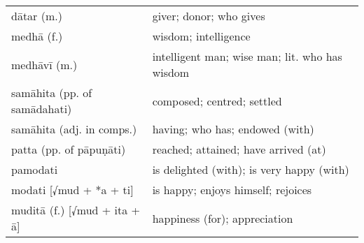 \documentclass[11pt,oneside]{memoir}
\begin{document}
\begin{longtable}{L{\colOne} L{\colTwo}}
dātar (m.) & giver; donor; who gives\\[0pt]
medhā (f.) & wisdom; intelligence\\[0pt]
medhāvī (m.) & intelligent man; wise man; lit. who has wisdom\\[0pt]
samāhita (pp. of samādahati) & composed; centred; settled\\[0pt]
samāhita (adj. in comps.) & having; who has; endowed (with)\\[0pt]
patta (pp. of pāpuṇāti) & reached; attained; have arrived (at)\\[0pt]
pamodati & is delighted (with); is very happy (with)\\[0pt]
modati [√mud + *a + ti] & is happy; enjoys himself; rejoices\\[0pt]
muditā (f.) [√mud + ita + ā] & happiness (for); appreciation\\[0pt]
\end{longtable}
\end{document}
